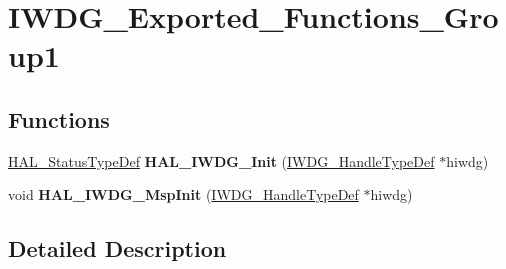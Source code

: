 \hypertarget{group___i_w_d_g___exported___functions___group1}{\section{I\-W\-D\-G\-\_\-\-Exported\-\_\-\-Functions\-\_\-\-Group1}
\label{group___i_w_d_g___exported___functions___group1}
}
\subsection*{Functions}
\begin{DoxyCompactItemize}
\item 
\hypertarget{group___i_w_d_g___exported___functions___group1_ga2e1669e60f2dc298fecaed919e7ae810}{\hyperlink{stm32l1xx__hal__def_8h_a63c0679d1cb8b8c684fbb0632743478f}{H\-A\-L\-\_\-\-Status\-Type\-Def} {\bfseries H\-A\-L\-\_\-\-I\-W\-D\-G\-\_\-\-Init} (\hyperlink{struct_i_w_d_g___handle_type_def}{I\-W\-D\-G\-\_\-\-Handle\-Type\-Def} $\ast$hiwdg)}\label{group___i_w_d_g___exported___functions___group1_ga2e1669e60f2dc298fecaed919e7ae810}

\item 
\hypertarget{group___i_w_d_g___exported___functions___group1_gaf26b08d1a805d1dd515cafd0278c240c}{void {\bfseries H\-A\-L\-\_\-\-I\-W\-D\-G\-\_\-\-Msp\-Init} (\hyperlink{struct_i_w_d_g___handle_type_def}{I\-W\-D\-G\-\_\-\-Handle\-Type\-Def} $\ast$hiwdg)}\label{group___i_w_d_g___exported___functions___group1_gaf26b08d1a805d1dd515cafd0278c240c}

\end{DoxyCompactItemize}


\subsection{Detailed Description}
